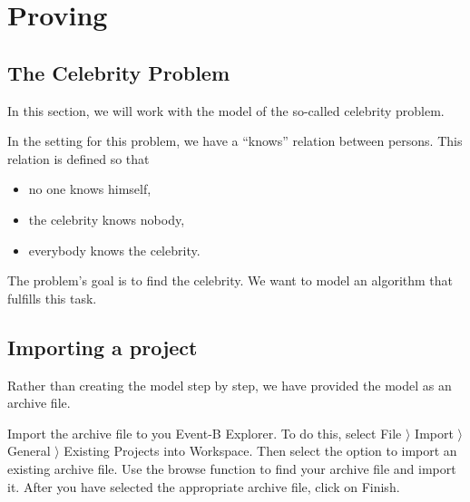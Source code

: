 \section{Proving}
\label{tut_proving}


\subsection{The Celebrity Problem}
\label{tut_celebrity_problem}

In this section, we will work with the model of the so-called celebrity problem.

\ifinprint\pagebreak\fi %

In the setting for this problem, we have a ``knows'' relation between persons.
This relation is defined so that

\begin{itemize}
	\item no one knows himself,
	\item the celebrity knows nobody,
	\item everybody knows the celebrity.
\end{itemize}    

The problem's goal is to find the celebrity. We want to model an algorithm that fulfills this task.

\subsection{Importing a project}
\label{tut_import_project}

Rather than creating the model step by step, we have provided the model as an archive file.


Import the archive file  to you Event-B Explorer. To do this, select \textsf{File $\rangle $ Import $\rangle $ General $\rangle $ Existing Projects into Workspace}. Then select the option to import an existing archive file. Use the browse function to find your archive file and import it. After you have selected the appropriate archive file, click on \textsf{Finish}.

